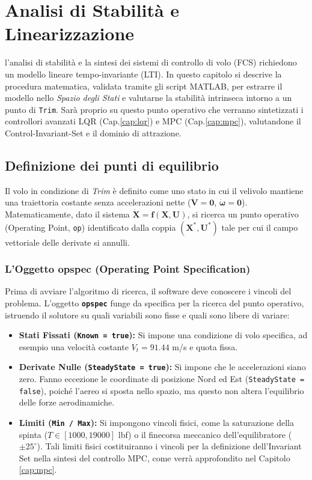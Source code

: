 \chapter{Analisi di Stabilità e Linearizzazione}
l'analisi di stabilità e la sintesi dei sistemi di controllo di volo (FCS) richiedono un modello lineare tempo-invariante (LTI). In questo capitolo si descrive la procedura matematica, validata tramite gli script MATLAB, per estrarre il modello nello \textit{Spazio degli Stati} e valutarne la stabilità intrinseca intorno a un punto di \texttt{Trim}. Sarà proprio su questo punto operativo che verranno sintetizzati i controllori avanzati LQR (Cap.\ref{cap:lqr}) e MPC (Cap.\ref{cap:mpc}), valutandone il Control-Invariant-Set e il dominio di attrazione.

\section{Definizione dei punti di equilibrio}
Il volo in condizione di \textit{Trim} è definito come uno stato in cui il velivolo mantiene una traiettoria costante senza accelerazioni nette ($\dot{\mathbf{V}} = \mathbf{0}$, $\dot{\boldsymbol{\omega}} = \mathbf{0}$). Matematicamente, dato il sistema $\dot{\mathbf{X}} = \mathbf{f}(\mathbf{X}, \mathbf{U})$, si ricerca un punto operativo (Operating Point, \texttt{op}) identificato dalla coppia $(\mathbf{X}^*, \mathbf{U}^*)$ tale per cui il campo vettoriale delle derivate si annulli.

\subsection{L'Oggetto opspec (Operating Point Specification)}
Prima di avviare l'algoritmo di ricerca, il software deve conoscere i vincoli del problema. L'oggetto \textbf{\texttt{opspec}} funge da  specifica per la ricerca del punto operativo, istruendo il solutore su quali variabili sono fisse e quali sono libere di variare:
\begin{itemize}
    \item \textbf{Stati Fissati (\texttt{Known = true}):} Si impone una condizione di volo specifica, ad esempio una velocità costante $V_t = 91.44$ m/s e quota fissa.
    \item \textbf{Derivate Nulle (\texttt{SteadyState = true}):} Si impone che le accelerazioni siano zero. Fanno eccezione le coordinate di posizione Nord ed Est (\texttt{SteadyState = false}), poiché l'aereo si sposta nello spazio, ma questo non altera l'equilibrio delle forze aerodinamiche.
    \item \textbf{Limiti (\texttt{Min / Max}):} Si impongono vincoli fisici, come la saturazione della spinta ($T \in [1000, 19000]$ lbf) o il finecorsa meccanico dell'equilibratore ($\pm 25^\circ$). Tali limiti fisici costituiranno i vincoli per la definizione dell'Invariant Set nella sintesi del controllo MPC, come verrà approfondito nel Capitolo \ref{cap:mpc}.
\end{itemize}

